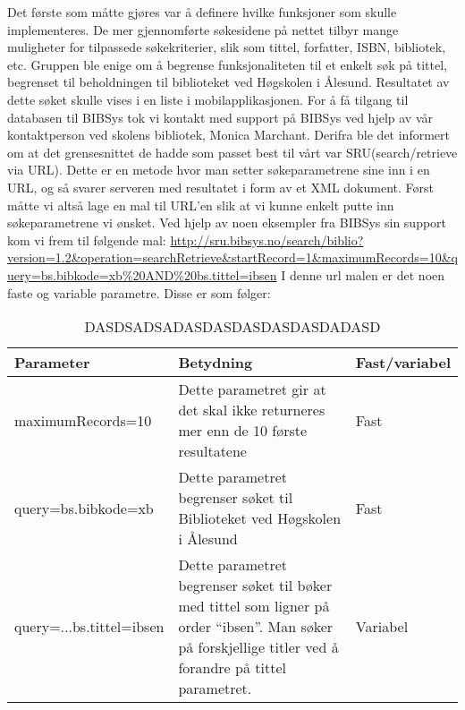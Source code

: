 \documentclass[../main.tex]{subfiles}
\begin{document}
Det første som måtte gjøres var å definere hvilke funksjoner som skulle implementeres. De mer gjennomførte søkesidene på nettet tilbyr mange muligheter for tilpassede søkekriterier, slik som tittel, forfatter, ISBN, bibliotek, etc. Gruppen ble enige om å begrense funksjonaliteten til et enkelt søk på tittel, begrenset til beholdningen til biblioteket ved Høgskolen i Ålesund. Resultatet av dette søket skulle vises i en liste i mobilapplikasjonen.\newline
\newline
For å få tilgang til databasen til BIBSys tok vi kontakt med support på BIBSys ved hjelp av vår kontaktperson ved skolens bibliotek, Monica Marchant. Derifra ble det informert om at det grensesnittet de hadde som passet best til vårt var SRU(search/retrieve via URL). Dette er en metode hvor man setter søkeparametrene sine inn i en URL, og så svarer serveren med resultatet i form av et XML dokument.
\newline
Først måtte vi altså lage en mal til URL’en slik at vi kunne enkelt putte inn søkeparametrene vi ønsket. Ved hjelp av noen eksempler fra BIBSys sin support kom vi frem til følgende mal:
\newline
\url{http://sru.bibsys.no/search/biblio?version=1.2\&operation=searchRetrieve\&startRecord=1\&maximumRecords=10\&query=bs.bibkode=xb\%20AND\%20bs.tittel=ibsen} \newline
I denne url malen er det noen faste og variable parametre. Disse er som følger:

\begin{table}[H]
\begin{center}
\caption{DASDSADSADASDASDASDASDASDADASD}
  \begin{tabular}{ | p{4cm} | p{8cm} | p{2cm} |}
    \hline
    Parameter & Betydning & Fast/variabel \\ \hline
    maximumRecords=10 & Dette parametret gir at det skal ikke returneres mer enn de 10 første resultatene & Fast \\ \hline
    query=bs.bibkode=xb & Dette parametret begrenser søket til Biblioteket ved Høgskolen i Ålesund & Fast \\ \hline
    query=...bs.tittel=ibsen & Dette parametret begrenser søket til bøker med tittel som ligner på order “ibsen”. Man søker på forskjellige titler ved å forandre på tittel parametret. & Variabel \\
    \hline
  \end{tabular}
\end{center}
\end{table}
\end{document}
